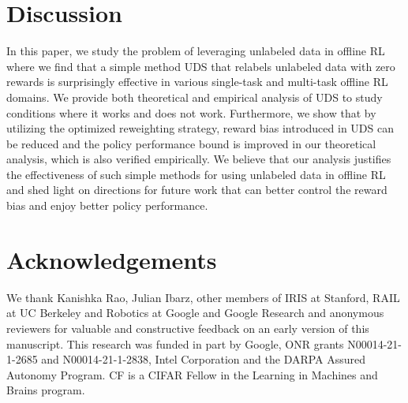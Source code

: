 \documentclass[../thesis.tex]{subfiles}
\begin{document}

    
\section{Discussion}

In this paper, we study the problem of leveraging unlabeled data in offline RL where we find that a simple method UDS that relabels unlabeled data with zero rewards is surprisingly effective in various single-task and multi-task offline RL domains. We provide both theoretical and empirical analysis of UDS to study conditions where it works and does not work. Furthermore, we show that by utilizing the optimized reweighting strategy, reward bias introduced in UDS can be reduced and the policy performance bound is improved in our theoretical analysis, which is also verified empirically. We believe that our analysis justifies the effectiveness of such simple methods for using unlabeled data in offline RL and shed light on directions for future work that can better control the reward bias and enjoy better policy performance.
    
    
\section*{Acknowledgements}
We thank Kanishka Rao, Julian Ibarz, other members of IRIS at Stanford, RAIL at UC Berkeley and Robotics at Google and Google Research and anonymous reviewers for valuable and constructive feedback on an early version of this manuscript. This research was funded in part by Google, ONR grants N00014-21-1-2685 and N00014-21-1-2838, Intel Corporation and the DARPA Assured Autonomy Program. CF is a CIFAR Fellow in the Learning in Machines and Brains program. 
\end{document}
